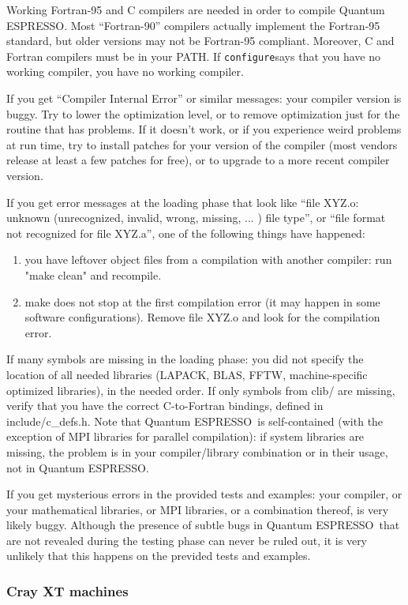 \documentclass[12pt,a4paper]{article}
\def\qe{{\sc Quantum ESPRESSO}}
\def\configure{\texttt{configure}}
\begin{document}
Working Fortran-95 and C compilers are needed in order
to compile \qe. Most ``Fortran-90'' compilers actually
implement the Fortran-95 standard, but older versions 
may not be Fortran-95 compliant. Moreover, 
C and Fortran compilers must be in your PATH.
If \configure says that you have no working compiler, you have 
no working compiler.
    
If you get ``Compiler Internal Error'' or similar messages: your
compiler version is buggy. Try to lower the optimization level, or to
remove optimization just for the routine that has problems. If it
doesn't work, or if you experience weird problems at run time, try to 
install patches for your version of the compiler (most vendors release
at least a few patches for free), or to upgrade to a more recent
compiler version.

If you get error messages at the loading phase that look like 
``file XYZ.o: unknown (unrecognized, invalid, wrong, missing, ... ) file
type'', or  ``file format not recognized for file XYZ.a'', one of
the following things have happened:
\begin{enumerate}
\item you have leftover object files from a compilation with another
  compiler: run "make clean" and recompile. 
\item make does not stop at the first compilation error (it may happen
  in some software configurations). Remove file XYZ.o and look for the
  compilation  error. 
\end{enumerate}
If many symbols are missing in the loading phase: you did not specify the
location of all needed libraries (LAPACK, BLAS, FFTW, machine-specific
optimized libraries), in the needed order. 
If only symbols from clib/ are missing, verify that
you have the correct C-to-Fortran bindings, defined in include/c\_defs.h.
Note that \qe\ is self-contained (with the exception of MPI libraries for 
parallel compilation): if system libraries are missing, the problem is in
your compiler/library combination or in their usage, not in \qe.

If you get mysterious errors in the provided tests and examples:
your compiler, or your mathematical libraries, or MPI libraries,
or a combination thereof, is very likely buggy. Although the 
presence of subtle bugs in \qe\ that are not revealed during 
the testing phase can never be ruled out, it is very unlikely
that this happens on the previded tests and examples. 

\subsubsection{Cray XT machines}
\end{document}
